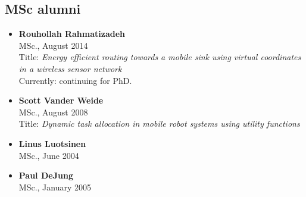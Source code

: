 \subsection*{MSc alumni}

\begin{itemize}
\item{\bf Rouhollah Rahmatizadeh}\\
    MSc., August 2014\\
    Title: {\em Energy efficient routing towards a mobile sink using virtual coordinates in a wireless sensor network}\\
    Currently: continuing for PhD.
\item{\bf Scott Vander Weide}\\
    MSc., August 2008\\
    Title: {\em Dynamic task allocation in mobile robot systems using utility
    functions}
\item {\bf Linus Luotsinen}\\
    MSc., June 2004    
\item{\bf Paul DeJung}\\
    MSc., January 2005
\end{itemize}    